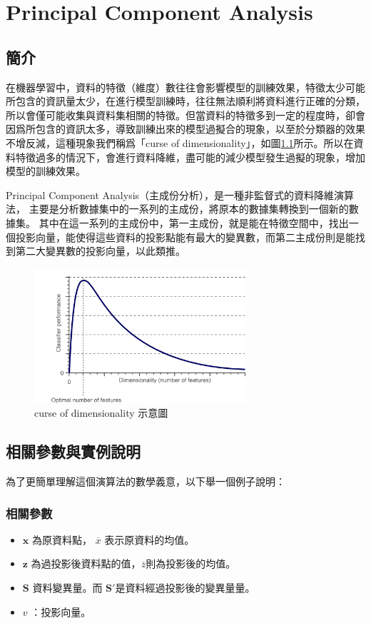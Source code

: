 \chapter{Principal Component Analysis}
\label{chapter:pca}
\section{簡介}
\label{sec:background}


在機器學習中，資料的特徵（維度）數往往會影響模型的訓練效果，特徵太少可能所包含的資訊量太少，在進行模型訓練時，往往無法順利將資料進行正確的分類，所以會僅可能收集與資料集相關的特徵。但當資料的特徵多到一定的程度時，卻會因爲所包含的資訊太多，導致訓練出來的模型過擬合的現象，以至於分類器的效果不增反減，這種現象我們稱爲「curse of dimensionality」，如圖\ref{fig:curse_of_dimesionality}所示。所以在資料特徵過多的情況下，會進行資料降維，盡可能的減少模型發生過擬的現象，增加模型的訓練效果。

Principal Component Analysis（主成份分析），是一種非監督式的資料降維演算法，
主要是分析數據集中的一系列的主成份，將原本的數據集轉換到一個新的數據集。
其中在這一系列的主成份中，第一主成份，就是能在特徵空間中，找出一個投影向量，能使得這些資料的投影點能有最大的變異數，而第二主成份則是能找到第二大變異數的投影向量，以此類推。




\begin{figure}[h]
	\centering
	\includegraphics[height=5cm]{./pic/NZgacRXF.png}
	\caption{curse of dimensionality 示意圖}
	\label{fig:curse_of_dimesionality}
\end{figure}

\section{相關參數與實例說明}
為了更簡單理解這個演算法的數學義意，以下舉一個例子說明：

\subsection{相關參數}
\begin{itemize}
	\item
		\(\mathbf{x}\) 為原資料點， \(\overline{x}\) 表示原資料的均值。
	\item
	     \(\mathbf{z}\) 為過投影後資料點的值，\(\overline{z}\)則為投影後的均值。 
	\item
	      \(\mathbf{S}\) 資料變異量。而 \(\mathbf{{S}'}\)是資料經過投影後的變異量量。
	\item
	      \(v\) ：投影向量。
\end{itemize}


